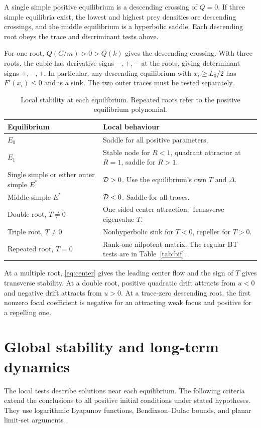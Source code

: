 \begin{theorem}\label{thm:local}
A single simple positive equilibrium is a descending crossing of \(Q=0\). If three simple equilibria exist, the lowest and highest prey densities are descending crossings, and the middle equilibrium is a hyperbolic saddle. Each descending root obeys the trace and discriminant tests above.
\end{theorem}
For one root, \(Q(C/m)>0>Q(k)\) gives the descending crossing. With three roots, the cubic has derivative signs \(-,+,-\) at the roots, giving determinant signs \(+,-,+\). In particular, any descending equilibrium with \(x_i\ge L_0/2\) has \(F'(x_i)\le0\) and is a sink. The two outer traces must be tested separately.

\begin{table}[tbp]\centering
\caption{Local stability at each equilibrium. Repeated roots refer to the positive equilibrium polynomial.}\label{tab:stability}
\begin{tabularx}{\linewidth}{@{}lY@{}}\toprule
Equilibrium & Local behaviour \\ \midrule
\(E_0\) & Saddle for all positive parameters.\\
\(E_1\) & Stable node for \(R<1\), quadrant attractor at \(R=1\), saddle for \(R>1\).\\
Single simple or either outer simple \(E^*\) & \(\mathcal D>0\). Use the equilibrium's own \(T\) and \(\Delta\).\\
Middle simple \(E^*\) & \(\mathcal D<0\). Saddle for all traces.\\
Double root, \(T\ne0\) & One-sided center attraction. Transverse eigenvalue \(T\).\\
Triple root, \(T\ne0\) & Nonhyperbolic sink for \(T<0\), repeller for \(T>0\).\\
Repeated root, \(T=0\) & Rank-one nilpotent matrix. The regular BT tests are in Table~\ref{tab:bif}.\\
\bottomrule\end{tabularx}
\end{table}
At a multiple root, \eqref{eq:center} gives the leading center flow and the sign of \(T\) gives transverse stability. At a double root, positive quadratic drift attracts from \(u<0\) and negative drift attracts from \(u>0\). At a trace-zero descending root, the first nonzero focal coefficient is negative for an attracting weak focus and positive for a repelling one.

\section{Global stability and long-term dynamics}\label{sec:global}
The local tests describe solutions near each equilibrium. The following criteria extend the conclusions to all positive initial conditions under stated hypotheses. They use logarithmic Lyapunov functions, Bendixson--Dulac bounds, and planar limit-set arguments \citep{cantrell01,haque11,hsu01}.

